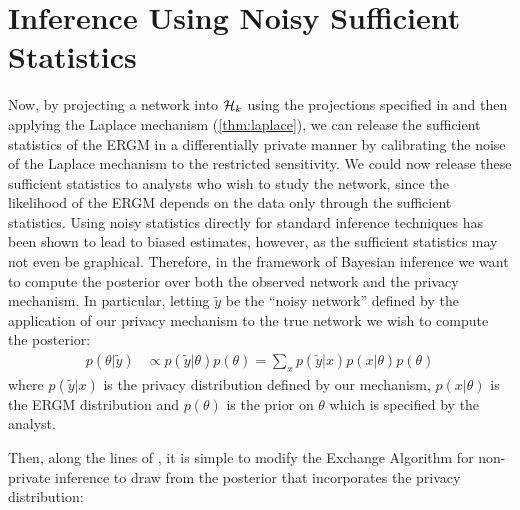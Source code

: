 \section{Inference Using Noisy Sufficient Statistics}

Now, by projecting a network into $\mathcal{H}_k$ using the projections specified in  and then applying the Laplace mechanism (\ref{thm:laplace}), we can release the sufficient statistics of the ERGM in a differentially private manner by calibrating the noise of the Laplace mechanism to the restricted sensitivity. We could now release these sufficient statistics to analysts who wish to study the network, since the likelihood of the ERGM depends on the data only through the sufficient statistics. Using noisy statistics directly for standard inference techniques has been shown to lead to biased estimates, however, as the sufficient statistics may not even be graphical. Therefore, in the framework of Bayesian inference we want to compute the posterior over both the observed network and the privacy mechanism. In particular, letting $\tilde{y}$ be the ``noisy network'' defined by the application of our privacy mechanism to the true network we wish to compute the posterior:
\begin{align}
p(\theta | \tilde{y}) &\propto p(\tilde{y} | \theta) p(\theta) = \sum_{x} p(\tilde{y} | x) p(x|\theta) p(\theta)  
\end{align}
where $p(\tilde{y} | x)$ is the privacy distribution defined by our mechanism, $p(x| \theta)$ is the ERGM distribution and $p(\theta)$ is the prior on $\theta$ which is specified by the analyst. 

Then, along the lines of \cite{LM14}, it is simple to modify the Exchange Algorithm for non-private inference to draw from the posterior that incorporates the privacy distribution:

